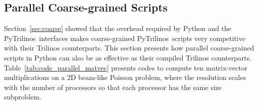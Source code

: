 \documentclass[acmtocl]{acmtrans2m}
\newcommand{\PyTrilinos}{{PyTrilinos}}
\begin{document}
\subsection{Parallel Coarse-grained Scripts}
\label{sec:parallel}

Section~\ref{sec:coarse} showed that the overhead required by Python
and the \PyTrilinos\ interfaces makes coarse-grained
\PyTrilinos\ scripts very competitive with their Trilinos
counterparts.  This section presents how parallel coarse-grained
scripts in Python can also be as effective as their compiled Trilinos
counterparts.  Table~\ref{tab:code_parallel_matvec} presents codes to
compute ten matrix-vector multiplications on a 2D beam-like Poisson
problem, where the resolution scales with the number of processors so
that each processor has the same size subproblem.
\end{document}
